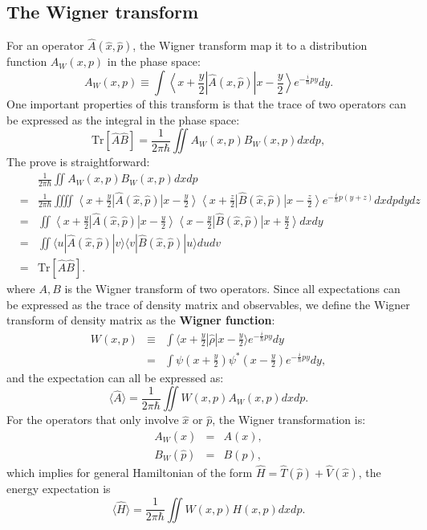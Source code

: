 \documentclass[aps,prb,superscriptaddress]{revtex4}
\begin{document}
\subsection{The Wigner transform}
For an operator $\hat A(\hat x, \hat p)$, the Wigner transform map it to a distribution function $A_W(x,p)$ in the phase space:
\begin{equation}
	A_W(x,p) \equiv \int \left\langle x+\frac{y}{2}\right|\hat A(\hat x,\hat p) \left|x-\frac{y}{2}\right\rangle e^{-\frac{i}{\hbar}py} dy.
\end{equation}
One important properties of this transform is that the trace of two operators can be expressed as the integral in the phase space:
\begin{equation}
	\mathrm{Tr}[\hat A \hat B]=\frac{1}{2\pi\hbar}\iint A_W(x,p)B_W(x,p)dxdp,
\end{equation}
The prove is straightforward:
\begin{eqnarray}
	&& \frac{1}{2\pi\hbar}\iint A_W(x,p)B_W(x,p)dxdp \nonumber \\
	&=& \frac{1}{2\pi\hbar}\iiiint \left\langle x+\frac{y}{2}\right|\hat A(\hat x,\hat p) \left|x-\frac{y}{2}\right\rangle\left\langle x+\frac{z}{2}\right|\hat B(\hat x,\hat p) \left|x-\frac{z}{2}\right\rangle e^{-\frac{i}{\hbar}p(y+z)} dxdpdydz \nonumber \\
	&=& \iint \left\langle x+\frac{y}{2}\right|\hat A(\hat x,\hat p) \left|x-\frac{y}{2}\right\rangle\left\langle x-\frac{y}{2}\right|\hat B(\hat x,\hat p) \left|x+\frac{y}{2}\right\rangle dxdy \nonumber \\
	&=& \iint \langle u|\hat A(\hat x,\hat p) |v\rangle \langle v|\hat B(\hat x,\hat p) |u\rangle dudv \nonumber \\
	&=& \mathrm{Tr}[\hat A \hat B].
\end{eqnarray}
where $A,B$ is the Wigner transform of two operators. Since all expectations can be expressed as the trace of density matrix and observables, we define the Wigner transform of density matrix as the \textbf{Wigner function}:
\begin{eqnarray}
	W(x,p) &\equiv & \int \langle x+\frac{y}{2}|\hat \rho|x-\frac{y}{2}\rangle e^{-\frac{i}{\hbar}py} dy \nonumber \\
	&=& \int \psi\left(x+\frac{y}{2}\right)\psi^{*}\left(x-\frac{y}{2}\right) e^{-\frac{i}{\hbar}py} dy,
\end{eqnarray}
and the expectation can all be expressed as:
\begin{equation}
	\langle \hat A \rangle = \frac{1}{2\pi \hbar}\iint W(x,p) A_W(x,p) dxdp.
\end{equation}
For the operators that only involve $\hat x$ or $\hat p$, the Wigner transformation is:
\begin{eqnarray}
	A_W(\hat x) &=& A(x), \\
	B_W(\hat p) &=& B(p),
\end{eqnarray}
which implies for general Hamiltonian of the form $\hat H = \hat T(\hat p)+\hat V(\hat x)$, the energy expectation is 
\begin{equation}
	\langle \hat H \rangle = \frac{1}{2\pi \hbar} \iint W(x,p)H(x,p) dxdp.
\end{equation}
\end{document}
